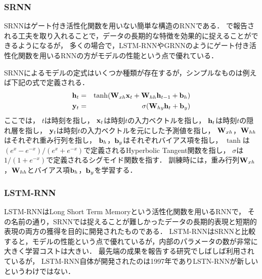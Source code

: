 \subsubsection{SRNN}
SRNNはゲート付き活性化関数を用いない簡単な構造のRNNである．
\cite{le2015simple, krueger2015regularizing}で報告される工夫を取り入れることで，データの長期的な特徴を効果的に捉えることができるようになるが，
多くの場合で，LSTM-RNNやGRNNのようにゲート付き活性化関数を用いるRNNの方がモデルの性能という点で優れている．

SRNNによるモデルの定式はいくつか種類が存在するが，シンプルなものは例えば下記の式で定義される．
\begin{eqnarray}
\label{eq:srnn1}
{\bf h}_t &=& \tanh({\bf W}_{xh} {\bf x}_t + {\bf W}_{hh}  {\bf h}_{t-1} + {\bf b}_h)\\
\label{eq:srnn2}
{\bf y}_t &=& \sigma( {\bf W}_{hy} {\bf h}_t + {\bf b}_y)
\end{eqnarray}
ここでは，
$t$は時刻を指し，
${\bf x}_t$は時刻$t$の入力ベクトルを指し，
${\bf h}_t$は時刻$t$の隠れ層を指し，
${\bf y}_t$は時刻$t$の入力ベクトルを元にした予測値を指し，
${\bf W}_{xh}$，${\bf W}_{hh}$はそれぞれ重み行列を指し，
${\bf b}_h$，${\bf b}_y$はそれぞれバイアス項を指し，
$\tanh$は$( e^x - e^{-x} )/( e^x + e^{-x} )$で定義されるHyperbolic Tangent関数を指し，
$\sigma$は$1 / (1 + e^{-x})$で定義されるシグモイド関数を指す．
訓練時には，重み行列${\bf W}_{xh}$，${\bf W}_{hh}$とバイアス項${\bf b}_h$，${\bf b}_y$を学習する．


\subsubsection{LSTM-RNN}
LSTM-RNNはLong Short Term Memoryという活性化関数を用いるRNNで，
その名前の通り，SRNNでは捉えることが難しかったデータの長期的表現と短期的表現の両方の獲得を目的に開発されたものである\cite{hochreiter1997long}．
LSTM-RNNはSRNNと比較すると，モデルの性能という点で優れているが，内部のパラメータの数が非常に大きく学習コストは大きい．
最先端の成果を報告する研究でしばしば利用されているが，
LSTM-RNN自体が開発されたのは1997年でありLSTN-RNNが新しいというわけではない．

